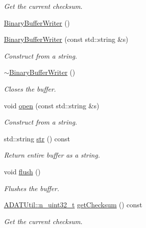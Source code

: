 \begin{DoxyCompactItemize}
\begin{DoxyCompactList}\small\item\em Get the current checksum. \end{DoxyCompactList}\item 
\mbox{\hyperlink{classADATIO_1_1BinaryBufferWriter_a3812e6b5808e6349bae019f79d78094a}{Binary\+Buffer\+Writer}} ()
\item 
\mbox{\hyperlink{classADATIO_1_1BinaryBufferWriter_acdbd4afbd1fde21aff3ad80d3c67a43c}{Binary\+Buffer\+Writer}} (const std\+::string \&s)
\begin{DoxyCompactList}\small\item\em Construct from a string. \end{DoxyCompactList}\item 
\mbox{\hyperlink{classADATIO_1_1BinaryBufferWriter_a1d17b712ef50e475fe7e4acfe6642547}{$\sim$\+Binary\+Buffer\+Writer}} ()
\begin{DoxyCompactList}\small\item\em Closes the buffer. \end{DoxyCompactList}\item 
void \mbox{\hyperlink{classADATIO_1_1BinaryBufferWriter_a394d7bf949c4def18697af392fb217a5}{open}} (const std\+::string \&s)
\begin{DoxyCompactList}\small\item\em Construct from a string. \end{DoxyCompactList}\item 
std\+::string \mbox{\hyperlink{classADATIO_1_1BinaryBufferWriter_a5c4f9b9c049173452e1cc70fe27ee188}{str}} () const
\begin{DoxyCompactList}\small\item\em Return entire buffer as a string. \end{DoxyCompactList}\item 
void \mbox{\hyperlink{classADATIO_1_1BinaryBufferWriter_accc3319508a804b054d21b6bddeef85d}{flush}} ()
\begin{DoxyCompactList}\small\item\em Flushes the buffer. \end{DoxyCompactList}\item 
\mbox{\hyperlink{namespaceADATUtil_ad945a8afa4db2d1f89b731964adae97e}{A\+D\+A\+T\+Util\+::n\+\_\+uint32\+\_\+t}} \mbox{\hyperlink{classADATIO_1_1BinaryBufferWriter_a3d7ec1583f03981f0a84571646be46f3}{get\+Checksum}} () const
\begin{DoxyCompactList}\small\item\em Get the current checksum. \end{DoxyCompactList}\item 

\end{DoxyCompactItemize}
